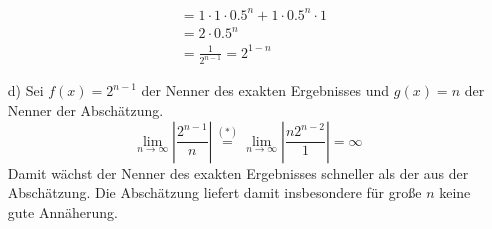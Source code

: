 \begin{enumerate}
\begin{equation*}
\begin{split}
											&= 1 \cdot 1 \cdot 0.5^n + 1 \cdot 0.5^n \cdot 1\\
											&= 2 \cdot 0.5^n\\
											&= \frac{1}{2^{n-1}}= 2^{1-n}
			\end{split}
		\end{equation*}
	\item[d)] Sei $f(x) = 2^{n - 1}$ der Nenner des exakten Ergebnisses und $g(x) = n$ der Nenner der Abschätzung.
		\begin{equation*}
			\lim\limits_{n\rightarrow \infty} |\frac{2^{n-1}}{n}| \stackrel{(*)}{=} \lim\limits_{n \rightarrow \infty} |\frac{n2^{n-2}}{1}| = \infty
		\end{equation*}
		Damit wächst der Nenner des exakten Ergebnisses schneller als der aus der Abschätzung. Die Abschätzung liefert damit insbesondere für große $n$ keine gute Annäherung.		
\end{enumerate}


